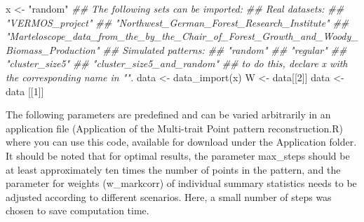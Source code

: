 \documentclass[
  letterpaper,
  DIV=11,
  numbers=noendperiod]{scrreprt}
\newenvironment{Shaded}{\begin{snugshade}}{\end{snugshade}}
\newcommand{\DecValTok}[1]{\textcolor[rgb]{0.68,0.00,0.00}{#1}}
\newcommand{\DocumentationTok}[1]{\textcolor[rgb]{0.37,0.37,0.37}{\textit{#1}}}
\newcommand{\FunctionTok}[1]{\textcolor[rgb]{0.28,0.35,0.67}{#1}}
\newcommand{\NormalTok}[1]{\textcolor[rgb]{0.00,0.23,0.31}{#1}}
\newcommand{\OtherTok}[1]{\textcolor[rgb]{0.00,0.23,0.31}{#1}}
\newcommand{\StringTok}[1]{\textcolor[rgb]{0.13,0.47,0.30}{#1}}
\begin{document}
\begin{Shaded}
\begin{Highlighting}[]
\NormalTok{x }\OtherTok{\textless{}{-}} \StringTok{"random"} \DocumentationTok{\#\# The following sets can be imported: }
                                   \DocumentationTok{\#\# Real datasets:}
                                    \DocumentationTok{\#\#    "VERMOS\_project" }
                                    \DocumentationTok{\#\#    "Northwest\_German\_Forest\_Research\_Institute" }
                                    \DocumentationTok{\#\#   "Marteloscope\_data\_from\_the\_by\_the\_Chair\_of\_Forest\_Growth\_and\_Woody\_Biomass\_Production"}
                                   \DocumentationTok{\#\# Simulated patterns:}
                                    \DocumentationTok{\#\#    "random"}
                                    \DocumentationTok{\#\#    "regular"}
                                    \DocumentationTok{\#\#    "cluster\_size5"}
                                    \DocumentationTok{\#\#    "cluster\_size5\_and\_random"}
                                   \DocumentationTok{\#\# to do this, declare x with the corresponding name in "". }
\NormalTok{data }\OtherTok{\textless{}{-}} \FunctionTok{data\_import}\NormalTok{(x)}
\NormalTok{W }\OtherTok{\textless{}{-}}\NormalTok{ data[[}\DecValTok{2}\NormalTok{]] }
\NormalTok{data }\OtherTok{\textless{}{-}}\NormalTok{ data [[}\DecValTok{1}\NormalTok{]] }
\end{Highlighting}
\end{Shaded}

The following parameters are predefined and can be varied arbitrarily in
an application file (Application of the Multi-trait Point pattern
reconstruction.R) where you can use this code, available for download
under the Application folder. It should be noted that for optimal
results, the parameter max\_steps should be at least approximately ten
times the number of points in the pattern, and the parameter for weights
(w\_markcorr) of individual summary statistics needs to be adjusted
according to different scenarios. Here, a small number of steps was
chosen to save computation time.
\end{document}
